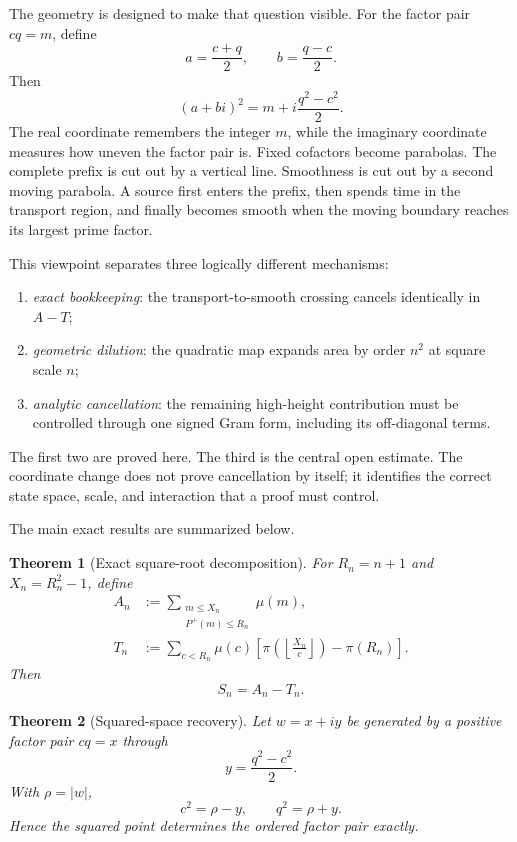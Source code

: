 \documentclass[11pt]{article}
\newtheorem{theorem}{Theorem}[section]
\theoremstyle{definition}
\theoremstyle{remark}
\newcommand{\Pplus}{P^{+}}
\newcommand{\1}{\mathbf{1}}
\begin{document}
The geometry is designed to make that question visible.  For the factor pair $cq=m$, define
\[
 a=\frac{c+q}{2},\qquad b=\frac{q-c}{2}.
\]
Then
\[
 (a+bi)^2=m+i\frac{q^2-c^2}{2}.
\]
The real coordinate remembers the integer $m$, while the imaginary coordinate measures how uneven the factor pair is.  Fixed cofactors become parabolas.  The complete prefix is cut out by a vertical line.  Smoothness is cut out by a second moving parabola.  A source first enters the prefix, then spends time in the transport region, and finally becomes smooth when the moving boundary reaches its largest prime factor.

This viewpoint separates three logically different mechanisms:
\begin{enumerate}[leftmargin=1.7em,itemsep=0.35em]
\item \emph{exact bookkeeping}: the transport-to-smooth crossing cancels identically in $A-T$;
\item \emph{geometric dilution}: the quadratic map expands area by order $n^2$ at square scale $n$;
\item \emph{analytic cancellation}: the remaining high-height contribution must be controlled through one signed Gram form, including its off-diagonal terms.
\end{enumerate}
The first two are proved here.  The third is the central open estimate.  The coordinate change does not prove cancellation by itself; it identifies the correct state space, scale, and interaction that a proof must control.

The main exact results are summarized below.

\begin{theorem}[Exact square-root decomposition]
\label{thm:intro-decomposition}
For $R_n=n+1$ and $X_n=R_n^2-1$, define
\begin{align*}
 A_n&:=\sum_{\substack{m\le X_n\\\Pplus(m)\le R_n}}\mu(m),\\
 T_n&:=\sum_{c<R_n}\mu(c)
 \left[
 \pi\!\left(\left\lfloor\frac{X_n}{c}\right\rfloor\right)-\pi(R_n)
 \right].
\end{align*}
Then
\[
 \boxed{S_n=A_n-T_n.}
\]
\end{theorem}

\begin{theorem}[Squared-space recovery]
\label{thm:intro-recovery}
Let $w=x+iy$ be generated by a positive factor pair $cq=x$ through
\[
 y=\frac{q^2-c^2}{2}.
\]
With $\rho=|w|$,
\[
 \boxed{c^2=\rho-y,\qquad q^2=\rho+y.}
\]
Hence the squared point determines the ordered factor pair exactly.
\end{theorem}
\end{document}
